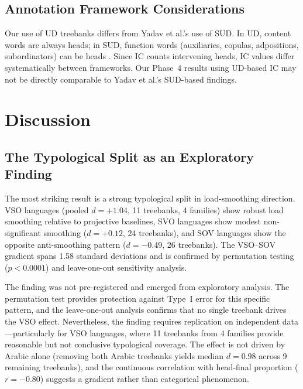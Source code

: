 \documentclass[11pt,letterpaper]{article}
\begin{document}
\subsection{Annotation Framework Considerations}

Our use of UD treebanks differs from Yadav et al.'s \citep{Yadav2022} use of SUD. In UD, content words are always heads; in SUD, function words (auxiliaries, copulas, adpositions, subordinators) can be heads \citep{Gerdes2019}. Since IC counts intervening heads, IC values differ systematically between frameworks. Our Phase~4 results using UD-based IC may not be directly comparable to Yadav et al.'s SUD-based findings.


\section{Discussion}
\label{sec:discussion}

\subsection{The Typological Split as an Exploratory Finding}

The most striking result is a strong typological split in load-smoothing direction. VSO languages (pooled $d = +1.04$, 11 treebanks, 4 families) show robust load smoothing relative to projective baselines, SVO languages show modest non-significant smoothing ($d = +0.12$, 24 treebanks), and SOV languages show the opposite anti-smoothing pattern ($d = -0.49$, 26 treebanks). The VSO--SOV gradient spans 1.58 standard deviations and is confirmed by permutation testing ($p < 0.0001$) and leave-one-out sensitivity analysis.

The finding was not pre-registered and emerged from exploratory analysis. The permutation test provides protection against Type~I error for this specific pattern, and the leave-one-out analysis confirms that no single treebank drives the VSO effect. Nevertheless, the finding requires replication on independent data---particularly for VSO languages, where 11 treebanks from 4 families provide reasonable but not conclusive typological coverage. The effect is not driven by Arabic alone (removing both Arabic treebanks yields median $d = 0.98$ across 9 remaining treebanks), and the continuous correlation with head-final proportion ($r = -0.80$) suggests a gradient rather than categorical phenomenon.
\end{document}

